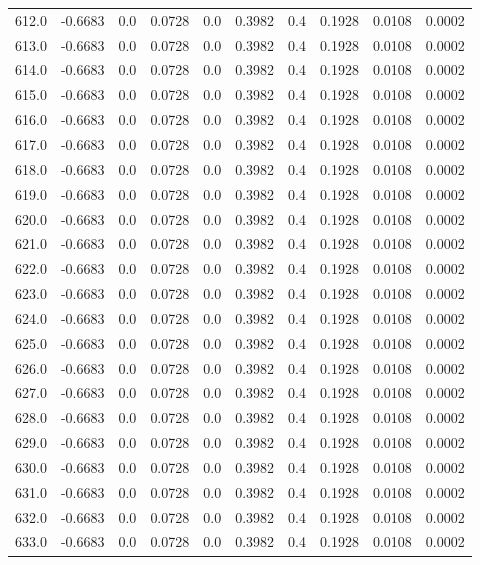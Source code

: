 \begin{longtable}{lrrrrrrrrr}
612.0 & -0.6683 & 0.0 & 0.0728 & 0.0 & 0.3982 & 0.4 & 0.1928 & 0.0108 & 0.0002 \\
613.0 & -0.6683 & 0.0 & 0.0728 & 0.0 & 0.3982 & 0.4 & 0.1928 & 0.0108 & 0.0002 \\
614.0 & -0.6683 & 0.0 & 0.0728 & 0.0 & 0.3982 & 0.4 & 0.1928 & 0.0108 & 0.0002 \\
615.0 & -0.6683 & 0.0 & 0.0728 & 0.0 & 0.3982 & 0.4 & 0.1928 & 0.0108 & 0.0002 \\
616.0 & -0.6683 & 0.0 & 0.0728 & 0.0 & 0.3982 & 0.4 & 0.1928 & 0.0108 & 0.0002 \\
617.0 & -0.6683 & 0.0 & 0.0728 & 0.0 & 0.3982 & 0.4 & 0.1928 & 0.0108 & 0.0002 \\
618.0 & -0.6683 & 0.0 & 0.0728 & 0.0 & 0.3982 & 0.4 & 0.1928 & 0.0108 & 0.0002 \\
619.0 & -0.6683 & 0.0 & 0.0728 & 0.0 & 0.3982 & 0.4 & 0.1928 & 0.0108 & 0.0002 \\
620.0 & -0.6683 & 0.0 & 0.0728 & 0.0 & 0.3982 & 0.4 & 0.1928 & 0.0108 & 0.0002 \\
621.0 & -0.6683 & 0.0 & 0.0728 & 0.0 & 0.3982 & 0.4 & 0.1928 & 0.0108 & 0.0002 \\
622.0 & -0.6683 & 0.0 & 0.0728 & 0.0 & 0.3982 & 0.4 & 0.1928 & 0.0108 & 0.0002 \\
623.0 & -0.6683 & 0.0 & 0.0728 & 0.0 & 0.3982 & 0.4 & 0.1928 & 0.0108 & 0.0002 \\
624.0 & -0.6683 & 0.0 & 0.0728 & 0.0 & 0.3982 & 0.4 & 0.1928 & 0.0108 & 0.0002 \\
625.0 & -0.6683 & 0.0 & 0.0728 & 0.0 & 0.3982 & 0.4 & 0.1928 & 0.0108 & 0.0002 \\
626.0 & -0.6683 & 0.0 & 0.0728 & 0.0 & 0.3982 & 0.4 & 0.1928 & 0.0108 & 0.0002 \\
627.0 & -0.6683 & 0.0 & 0.0728 & 0.0 & 0.3982 & 0.4 & 0.1928 & 0.0108 & 0.0002 \\
628.0 & -0.6683 & 0.0 & 0.0728 & 0.0 & 0.3982 & 0.4 & 0.1928 & 0.0108 & 0.0002 \\
629.0 & -0.6683 & 0.0 & 0.0728 & 0.0 & 0.3982 & 0.4 & 0.1928 & 0.0108 & 0.0002 \\
630.0 & -0.6683 & 0.0 & 0.0728 & 0.0 & 0.3982 & 0.4 & 0.1928 & 0.0108 & 0.0002 \\
631.0 & -0.6683 & 0.0 & 0.0728 & 0.0 & 0.3982 & 0.4 & 0.1928 & 0.0108 & 0.0002 \\
632.0 & -0.6683 & 0.0 & 0.0728 & 0.0 & 0.3982 & 0.4 & 0.1928 & 0.0108 & 0.0002 \\
633.0 & -0.6683 & 0.0 & 0.0728 & 0.0 & 0.3982 & 0.4 & 0.1928 & 0.0108 & 0.0002 \\

\end{longtable}

